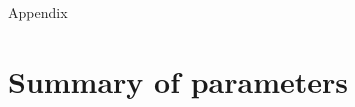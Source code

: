 \documentclass[12pt, oneside]{article}   	%
\begin{document}
\newpage{}

{\LARGE Appendix}

\appendix

\renewcommand{\theequation}{A\arabic{equation}}
\renewcommand{\thetable}{A\arabic{table}}
\setcounter{equation}{0}  %
\setcounter{figure}{0}
\setcounter{table}{0}

\section*{Summary of parameters}

\end{document}
